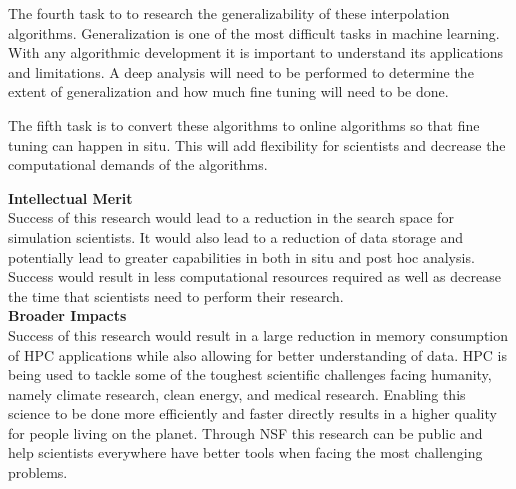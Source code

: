 \documentclass[12pt]{article}
\begin{document}
\noindent The fourth task to to research the generalizability of these
interpolation algorithms. Generalization is one of the most difficult tasks in
machine learning. With any algorithmic development it is important to understand
its applications and limitations. A deep analysis will need to be performed to
determine the extent of generalization and how much fine tuning will need to be
done. 

\noindent The fifth task is to convert these algorithms to online algorithms so
that fine tuning can happen in situ. This will add flexibility for scientists
and decrease the computational demands of the algorithms. 

\noindent
\textbf{Intellectual Merit}
\\\noindent
Success of this research would lead to a reduction in the search space for
simulation scientists. It would also lead to a reduction of data storage and
potentially lead to greater capabilities in both in situ and post hoc analysis. 
Success would result in less computational resources required as well as
decrease the time that scientists need to perform their research. 
%
\\\textbf{Broader Impacts} 
\\\noindent
Success of this research would result in a large reduction in memory consumption
of HPC applications while also allowing for better understanding of data. HPC is
being used to tackle some of the toughest scientific challenges facing humanity,
namely climate research, clean energy, and medical research. Enabling this
science to be done more efficiently and faster directly results in a higher
quality for people living on the planet. Through NSF this research can be public
and help scientists everywhere have better tools when facing the most
challenging problems.


\footnotesize


%
%
\end{document}
